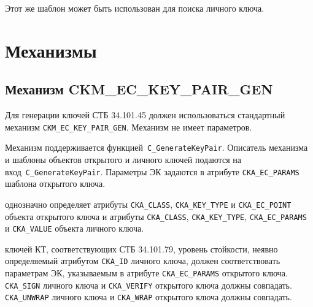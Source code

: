 Этот же шаблон может быть использован для поиска личного ключа.



\section{Механизмы}
                                                                                                                 
\subsection{Механизм CKM\_EC\_KEY\_PAIR\_GEN}\label{CRYPTOKI.Gen}


Для генерации ключей СТБ 34.101.45 должен использоваться стандартный 
механизм \verb|CKM_EC_KEY_PAIR_GEN|. Механизм не имеет параметров. 

Механизм поддерживается функцией~\verb|C_GenerateKeyPair|. 
%
Описатель механизма и шаблоны объектов открытого и личного
ключей подаются на вход~\verb|C_GenerateKeyPair|. Параметры ЭК задаются в 
атрибуте \verb|CKA_EC_PARAMS| шаблона открытого ключа.

 однозначно определяет атрибуты
\verb|CKA_CLASS|, \verb|CKA_KEY_TYPE| и \verb|CKA_EC_POINT|
объекта открытого ключа и атрибуты
\verb|CKA_CLASS|, \verb|CKA_KEY_TYPE|, \verb|CKA_EC_PARAMS| и 
\verb|CKA_VALUE| объекта личного ключа.


 ключей КТ, соответствующих СТБ 34.101.79,
уровень стойкости, неявно определяемый атрибутом \verb|CKA_ID| личного ключа,
должен соответствовать параметрам ЭК, указываемым в атрибуте 
\verb|CKA_EC_PARAMS| открытого ключа.  
\verb|CKA_SIGN| личного ключа и \verb|CKA_VERIFY| открытого ключа должны 
совпадать.  \verb|CKA_UNWRAP| личного ключа и 
\verb|CKA_WRAP| открытого ключа должны совпадать. 


